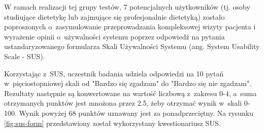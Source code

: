 \par
W ramach realizacji tej grupy testów, 7 potencjalnych użytkowników (tj. osoby studiujące dietetykę lub zajmujące się profesjonalnie dietetyką)
zostało poproszonych o~zasymulowanie przeprowadzania kompleksowej wizyty pacjenta
i wyrażenie opinii o~używalności systemu poprzez odpowiedź na pytania ustandaryzowanego formularza Skali Używalności Systemu (ang. System Usability Scale - SUS)\cite{url:sus}.

\par
Korzystając z~SUS, uczestnik badania udziela odpowiedzi na 10 pytań w~pięciostopniowej skali od "Bardzo się zgadzam" do "Bardzo się nie zgadzam".
Rezultaty następnie są konwertowane na wartość liczbową z~zakresu 0-4, a~suma otrzymanych punktów jest mnożona przez 2.5, żeby otrzymać wynik w~skali 0-100.
Wynik powyżej 68 punktów uznawany jest za ponadprzeciętny.
Na rysunku \ref{fig:sus-form} przedstawiony został wykorzystany kwestionariusz SUS.



\thispagestyle{normal}
